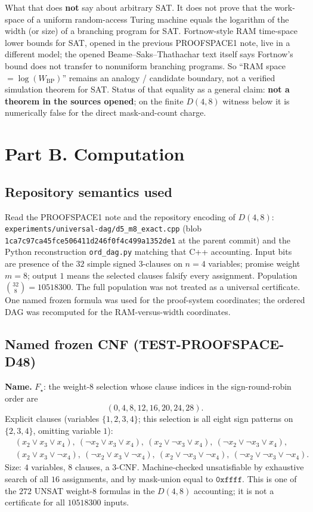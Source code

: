 \documentclass[11pt]{article}
\begin{document}
What that does \textbf{not} say about arbitrary SAT.
It does not prove that the work-space of a uniform random-access Turing machine equals the logarithm of the width (or size) of a branching program for SAT.
Fortnow-style RAM time-space lower bounds for SAT, opened in the previous PROOFSPACE1 note, live in a different model; the opened Beame--Saks--Thathachar text itself says Fortnow's bound does not transfer to nonuniform branching programs.
So ``RAM space \(= \log(W_{\mathrm{BP}})\)'' remains an analogy / candidate boundary, not a verified simulation theorem for SAT.
Status of that equality as a general claim: \textbf{not a theorem in the sources opened}; on the finite \(D(4,8)\) witness below it is numerically false for the direct mask-and-count charge.

\section*{Part B. Computation}

\subsection*{Repository semantics used}
Read the PROOFSPACE1 note and the repository encoding of \(D(4,8)\):
\texttt{experiments/universal-dag/d5\_m8\_exact.cpp}
(blob \texttt{1ca7c97ca45fce506411d246f0f4c499a1352de1} at the parent commit)
and the Python reconstruction
\texttt{ord\_dag.py} matching that C++ accounting.
Input bits are presence of the \(32\) simple signed \(3\)-clauses on \(n=4\) variables; promise weight \(m=8\); output \(1\) means the selected clauses falsify every assignment.
Population \(\binom{32}{8}=10518300\).
The full population was not treated as a universal certificate.
One named frozen formula was used for the proof-system coordinates; the ordered DAG was recomputed for the RAM-versus-width coordinates.

\subsection*{Named frozen CNF (TEST-PROOFSPACE-D48)}
\textbf{Name.} \(F_\star\): the weight-\(8\) selection whose clause indices in the sign-round-robin order are
\[
(0,4,8,12,16,20,24,28).
\]
Explicit clauses (variables \(\{1,2,3,4\}\); this selection is all eight sign patterns on \(\{2,3,4\}\), omitting variable \(1\)):
\begin{align*}
&(x_2\lor x_3\lor x_4),\ 
(\lnot x_2\lor x_3\lor x_4),\ 
(x_2\lor \lnot x_3\lor x_4),\ 
(\lnot x_2\lor \lnot x_3\lor x_4),\\
&(x_2\lor x_3\lor \lnot x_4),\ 
(\lnot x_2\lor x_3\lor \lnot x_4),\ 
(x_2\lor \lnot x_3\lor \lnot x_4),\ 
(\lnot x_2\lor \lnot x_3\lor \lnot x_4).
\end{align*}
Size: \(4\) variables, \(8\) clauses, a \(3\)-CNF.
Machine-checked unsatisfiable by exhaustive search of all \(16\) assignments, and by mask-union equal to \(\mathtt{0xffff}\).
This is one of the \(272\) UNSAT weight-\(8\) formulas in the \(D(4,8)\) accounting; it is not a certificate for all \(10518300\) inputs.
\end{document}
